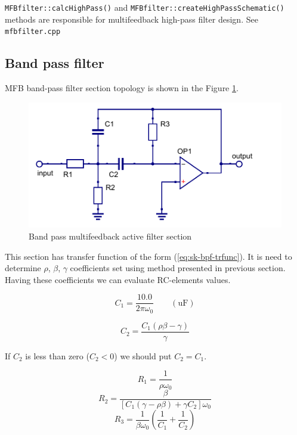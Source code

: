 \verb|MFBfilter::calcHighPass()| and \verb|MFBfilter::createHighPassSchematic()|
methods are responsible for multifeedback high-pass filter design. See
\verb|mfbfilter.cpp|

\subsection{Band pass filter}

MFB band-pass filter section topology is shown in the Figure \ref{fig:mfb-bpf}.

\begin{figure}[!ht]
  \centering
  \includegraphics[width=0.6\linewidth]{pics/mfb-bpf}
  \caption{Band pass multifeedback active filter section}
  \label{fig:mfb-bpf}
\end{figure}

This section has transfer function of the form (\ref{eq:sk-bpf-trfunc}). It is 
need to determine $\rho$, $\beta$, $\gamma$ coefficients set using method 
presented in previous section. Having these coefficients we can evaluate 
RC-elements values. 

\begin{equation}
 C_1=\frac{10.0}{2\pi\omega_0}\qquad(\mbox{uF})
\end{equation}

\begin{equation}
 C_2 = \frac{C_1(\rho\beta-\gamma)}{\gamma}
\end{equation}

If $C_2$ is less than zero ($C_2<0$) we should put $C_2=C_1$.

\begin{equation}
 R_1 = \frac{1}{\rho\omega_0}
\end{equation}
\begin{equation}
 R_2=\frac{\beta}{[C_1(\gamma-\rho\beta)+\gamma C_2]\omega_0}
\end{equation}
\begin{equation}
 R_3=\frac{1}{\beta\omega_0}\left(\frac{1}{C_1}+\frac{1}{C_2}\right)
\end{equation}

